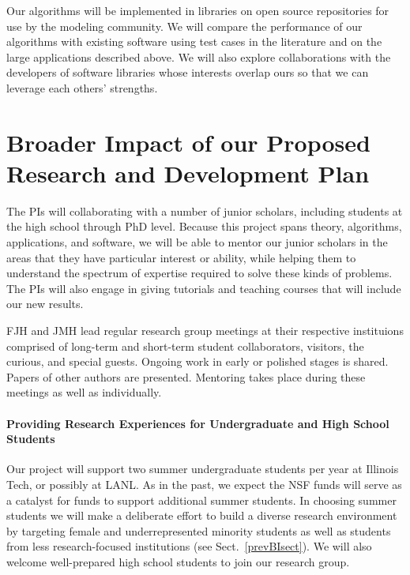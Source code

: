 \documentclass[11pt]{NSFamsart}
\begin{document}
Our algorithms will be implemented in libraries on open source repositories for use by the modeling community.  We will compare the performance of our algorithms with existing software using test cases in the literature and on the large applications described above.  We will also explore collaborations with the developers of software libraries whose interests overlap ours so that we can leverage each others' strengths.


\section{Broader Impact of our Proposed Research and Development Plan}

The PIs will collaborating with a number of junior scholars, including students at the high school through PhD level.  Because this project spans theory, algorithms, applications, and software, we will be able to mentor our junior scholars in the areas that they have particular interest or ability, while helping them to understand the spectrum of expertise required to solve these kinds of problems.  The PIs will also engage in giving tutorials and teaching courses that will include our new results.



FJH and JMH lead regular research group meetings at their respective instituions comprised of long-term and short-term student 
collaborators, visitors, the curious, and special guests.  Ongoing work in early or polished stages is shared.  Papers of other authors are presented.  Mentoring takes place during these meetings as well as individually.

\paragraph*{Providing Research Experiences for Undergraduate and High School Students} 
Our project will support two summer undergraduate students per year at Illinois Tech, or possibly at LANL. As in the past, we expect the NSF funds will serve as a catalyst for funds to 
support additional summer students. In choosing summer students we will make a deliberate effort to 
build 
a diverse research environment by targeting female and underrepresented minority students as well 
as students from less research-focused institutions (see Sect.~\ref{prevBIsect}). We will also 
welcome well-prepared high school students to join our research group.
\end{document}
